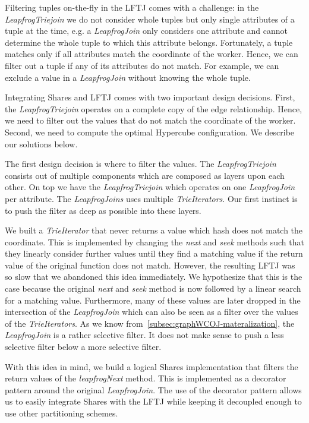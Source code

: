 Filtering tuples on-the-fly in the \textsc{LFTJ} comes with a challenge: in the \textit{LeapfrogTriejoin} we do not consider whole tuples
but only single attributes of a tuple at the time,
e.g. a \textit{LeapfrogJoin} only considers one attribute and cannot determine the whole tuple to which this attribute belongs.
Fortunately, a tuple matches only if all attributes match the coordinate of the worker.
Hence, we can filter out a tuple if any of its attributes do not match.
For example, we can exclude a value in a \textit{LeapfrogJoin} without knowing the whole tuple.

Integrating Shares and \textsc{LFTJ} comes with two important design decisions.
First, the \textit{LeapfrogTriejoin} operates on a complete copy of the edge relationship.
Hence, we need to filter out the values that do not match the coordinate of the worker.
Second, we need to compute the optimal Hypercube configuration.
We describe our solutions below.

The first design decision is where to filter the values.
The \textit{LeapfrogTriejoin} consists out of multiple components which are composed as layers upon each other.
On top we have the \textit{LeapfrogTriejoin} which operates on one \textit{LeapfrogJoin} per attribute.
The \textit{LeapfrogJoins} uses multiple \textit{TrieIterators}.
Our first instinct is to push the filter as deep as possible into these layers.

We built a \textit{TrieIterator} that never returns a value which hash does not match the coordinate.
This is implemented by changing the \textit{next} and \textit{seek} methods such that they linearly
consider further values until they find a matching value if the return value of the original function does not match.
However, the resulting \textsc{LFTJ} was so slow that we abandoned this idea immediately.
We hypothesize that this is the case because the original \textit{next} and \textit{seek} method is now followed
by a linear search for a matching value.
Furthermore, many of these values are later dropped in the intersection of the \textit{LeapfrogJoin} which
can also be seen as a filter over the values of the \textit{TrieIterators}.
As we know from~\cref{subsec:graphWCOJ-materalization}, the \textit{LeapfrogJoin} is a rather selective filter.
It does not make sense to push a less selective filter below a more selective filter.

With this idea in mind, we build a logical Shares implementation that filters the return values of the \textit{leapfrogNext}
method.
This is implemented as a decorator pattern around the original \textit{LeapfrogJoin}.
The use of the decorator pattern allows us to easily integrate Shares with the \textsc{LFTJ} while keeping it decoupled enough
to use other partitioning schemes.


